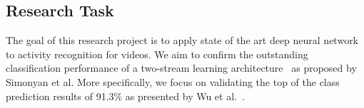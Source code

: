 \subsection*{Research Task}
The goal of this research project is to apply state of the art deep neural network to activity recognition for videos.
We aim to confirm the outstanding classification performance of a two-stream learning architecture~\cite{simonyan2014two} as proposed by Simonyan et al.
More specifically, we focus on validating the top of the class prediction results of 91.3\% as presented by Wu et al.~\cite{wu2015modeling}.
